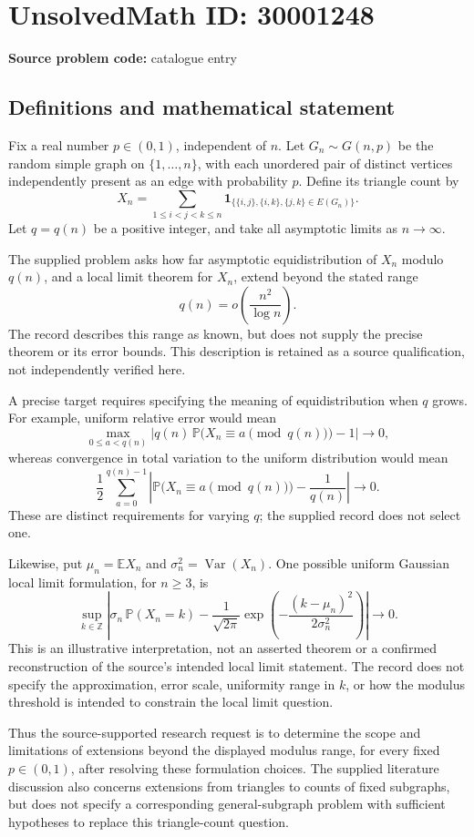 \documentclass[11pt]{article}
\begin{document}
\section*{UnsolvedMath ID: 30001248}
\textbf{Source problem code:} catalogue entry
\subsection{Definitions and mathematical statement}
Fix a real number \(p\in(0,1)\), independent of \(n\). Let \(G_n\sim G(n,p)\) be the random simple graph on \(\{1,\ldots,n\}\), with each unordered pair of distinct vertices independently present as an edge with probability \(p\). Define its triangle count by
\[
X_n=\sum_{1\le i<j<k\le n}\mathbf 1_{\{\{i,j\},\{i,k\},\{j,k\}\in E(G_n)\}}.
\]
Let \(q=q(n)\) be a positive integer, and take all asymptotic limits as \(n\to\infty\).

The supplied problem asks how far asymptotic equidistribution of \(X_n\) modulo \(q(n)\), and a local limit theorem for \(X_n\), extend beyond the stated range
\[
q(n)=o\!\left(\frac{n^2}{\log n}\right).
\]
The record describes this range as known, but does not supply the precise theorem or its error bounds. This description is retained as a source qualification, not independently verified here.

A precise target requires specifying the meaning of equidistribution when \(q\) grows. For example, uniform relative error would mean
\[
\max_{0\le a<q(n)}\left|q(n)\,\mathbb P\bigl(X_n\equiv a\pmod{q(n)}\bigr)-1\right|\longrightarrow0,
\]
whereas convergence in total variation to the uniform distribution would mean
\[
\frac12\sum_{a=0}^{q(n)-1}\left|\mathbb P\bigl(X_n\equiv a\pmod{q(n)}\bigr)-\frac1{q(n)}\right|\longrightarrow0.
\]
These are distinct requirements for varying \(q\); the supplied record does not select one.

Likewise, put \(\mu_n=\mathbb E X_n\) and \(\sigma_n^2=\operatorname{Var}(X_n)\). One possible uniform Gaussian local limit formulation, for \(n\ge3\), is
\[
\sup_{k\in\mathbb Z}\left|\sigma_n\,\mathbb P(X_n=k)-\frac1{\sqrt{2\pi}}\exp\!\left(-\frac{(k-\mu_n)^2}{2\sigma_n^2}\right)\right|\longrightarrow0.
\]
This is an illustrative interpretation, not an asserted theorem or a confirmed reconstruction of the source's intended local limit statement. The record does not specify the approximation, error scale, uniformity range in \(k\), or how the modulus threshold is intended to constrain the local limit question.

Thus the source-supported research request is to determine the scope and limitations of extensions beyond the displayed modulus range, for every fixed \(p\in(0,1)\), after resolving these formulation choices. The supplied literature discussion also concerns extensions from triangles to counts of fixed subgraphs, but does not specify a corresponding general-subgraph problem with sufficient hypotheses to replace this triangle-count question.
\end{document}

